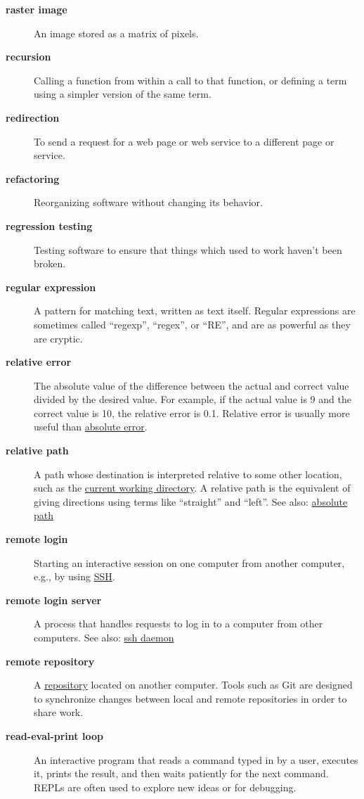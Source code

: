 \documentclass[
]{krantz}
\begin{document}
\begin{description}
\item[\textbf{raster image}]
An image stored as a matrix of pixels.
\item[\textbf{recursion}]
Calling a function from within a call to that function, or defining a term using a simpler version of the same term.
\item[\textbf{redirection}]
To send a request for a web page or web service to a different page or service.
\item[\textbf{refactoring}]
Reorganizing software without changing its behavior.
\item[\textbf{regression testing}]
Testing software to ensure that things which used to work haven't been broken.
\item[\textbf{regular expression}]
A pattern for matching text, written as text itself. Regular expressions are sometimes called ``regexp'', ``regex'', or ``RE'', and are as powerful as they are cryptic.
\item[\textbf{relative error}]
The absolute value of the difference between the actual and correct value divided by the desired value. For example, if the actual value is 9 and the correct value is 10, the relative error is 0.1. Relative error is usually more useful than \protect\hyperlink{absolute_error}{absolute error}.
\item[\textbf{relative path}]
A path whose destination is interpreted relative to some other location, such as the \protect\hyperlink{current_working_directory}{current working directory}. A relative path is the equivalent of giving directions using terms like ``straight'' and ``left''. See also: \protect\hyperlink{absolute_path}{absolute path}
\item[\textbf{remote login}]
Starting an interactive session on one computer from another computer, e.g., by using \protect\hyperlink{ssh}{SSH}.
\item[\textbf{remote login server}]
A process that handles requests to log in to a computer from other computers. See also: \protect\hyperlink{ssh_daemon}{ssh daemon}
\item[\textbf{remote repository}]
A \protect\hyperlink{repository}{repository} located on another computer. Tools such as Git are designed to synchronize changes between local and remote repositories in order to share work.
\item[\textbf{read-eval-print loop}]
An interactive program that reads a command typed in by a user, executes it, prints the result, and then waits patiently for the next command. REPLs are often used to explore new ideas or for debugging.

\end{description}
\end{document}
